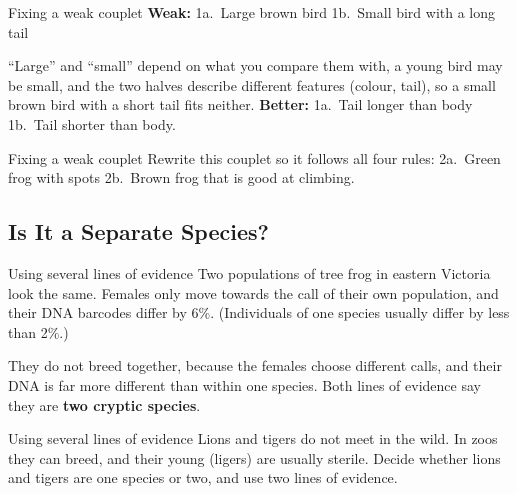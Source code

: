 \begin{workedex}{Fixing a weak couplet}
\textbf{Weak:} 1a.\ Large brown bird \qquad 1b.\ Small bird with a long tail

\smallskip
``Large'' and ``small'' depend on what you compare them with, a young bird may be small, and the two halves describe different features (colour, tail), so a small brown bird with a short tail fits neither.
\textbf{Better:} 1a.\ Tail longer than body \qquad 1b.\ Tail shorter than body.
\end{workedex}

\begin{wedo}{Fixing a weak couplet}
Rewrite this couplet so it follows all four rules: 2a.\ Green frog with spots \qquad 2b.\ Brown frog that is good at climbing.
\answerbox{4cm}
\end{wedo}

\subsection{Is It a Separate Species?}\label{sub:a3.2}

\begin{workedex}{Using several lines of evidence}
Two populations of tree frog in eastern Victoria look the same. Females only move towards the call of their own population, and their DNA barcodes differ by 6\%. (Individuals of one species usually differ by less than 2\%.)

\smallskip
They do not breed together, because the females choose different calls, and their DNA is far more different than within one species. Both lines of evidence say they are \textbf{two cryptic species}.
\end{workedex}

\begin{wedo}{Using several lines of evidence}
Lions and tigers do not meet in the wild. In zoos they can breed, and their young (ligers) are usually sterile. Decide whether lions and tigers are one species or two, and use two lines of evidence.
\answerbox{4.5cm}
\end{wedo}

\label{prac:3}


\label{ext:3}

